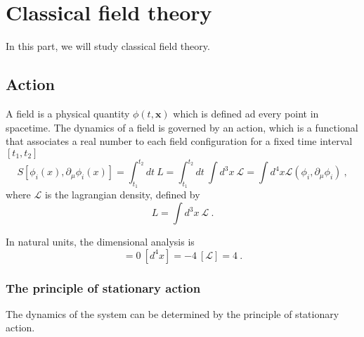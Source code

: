 \part{Classical field theory}

    In this part, we will study classical field theory.

\chapter{Action}

    A field is a physical quantity $\phi(t, \mathbf x)$ which is defined ad every point in spacetime. The dynamics of a field is governed by an action, which is a functional that associates a real number to each field configuration for a fixed time interval $[t_1, t_2]$
    \begin{equation}\label{action}
        S[\phi_i(x), \partial_\mu \phi_i(x)] = \int_{t_1}^{t_2} dt ~ L = \int_{t_1}^{t_2} dt ~ \int d^3x ~ \mathcal L = \int d^4 x \mathcal L (\phi_i, \partial_\mu \phi_i) ~,
    \end{equation}
    where $\mathcal L$ is the lagrangian density, defined by 
    \begin{equation*}
        L = \int d^3x ~ \mathcal L ~.
    \end{equation*}

    In natural units, the dimensional analysis is 
    \begin{equation*}
        [S] = 0 ~ [d^4 x]=-4 ~ [\mathcal L] = 4 ~.
    \end{equation*}

\section{The principle of stationary action}

    The dynamics of the system can be determined by the principle of stationary action. 

